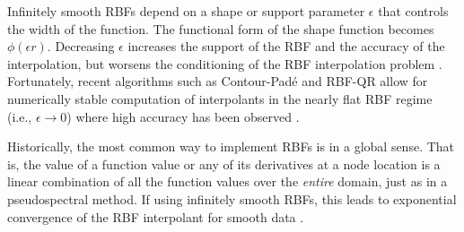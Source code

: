 Infinitely smooth RBFs depend on a shape or support parameter $\epsilon$ that controls the width of the function. The functional form of the shape function becomes $\phi(\epsilon r)$. Decreasing $\epsilon$ increases the support of the RBF and  the accuracy of the interpolation, but worsens the conditioning of the RBF interpolation problem \cite{Schaback1995}. Fortunately, recent algorithms such as Contour-Pad\'{e} \cite{Fornberg2004} and RBF-QR \cite{Fornberg2007, Fornberg2011a} allow for numerically stable computation of interpolants in the nearly flat RBF regime (i.e., $\epsilon \rightarrow 0$) where high accuracy has been observed \cite{Larsson2003, Fornberg2008}.

Historically, the most common way to implement RBFs is in a global sense. That is, the value of a function value or any of its derivatives 
at a node location is a linear combination of all the function values over the \textit{entire} domain, just as in a pseudospectral method. If using infinitely smooth RBFs, this leads to exponential convergence of the RBF interpolant for smooth data . %


